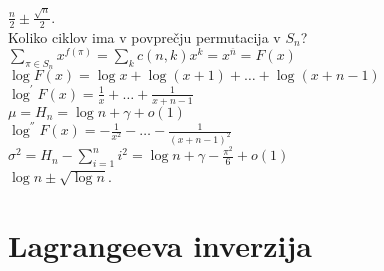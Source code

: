 \documentclass[a4paper, 12pt]{book}
\theoremstyle{definition}
\theoremstyle{remark}
\begin{document}
$\frac{n}{2} \pm \frac{\sqrt{n}}{2}$. \\
Koliko ciklov ima v povprečju permutacija v $S_n$? \\
$\sum_{\pi \in S_n} x^{f(\pi)} = \sum_k c(n,k) x^k = x^{\overline{n}} = F(x)$ \\
$\log F(x) = \log x + \log (x+1) + \dots + \log (x+n-1)$ \\
$\log^{'} F(x) = \frac{1}{x} + \dots + \frac{1}{x+n-1}$ \\
$\mu = H_n = \log n + \gamma + o(1)$ \\
$\log^{''} F(x) = -\frac{1}{x^2} - \dots - \frac{1}{(x+n-1)^2}$ \\
$\sigma^2 = H_n - \sum_{i=1}^n i^2 = \log n + \gamma - \frac{\pi^2}{6} + o(1)$ \\
$\log n \pm \sqrt{\log n}$.



\section{Lagrangeeva inverzija}
\end{document}
